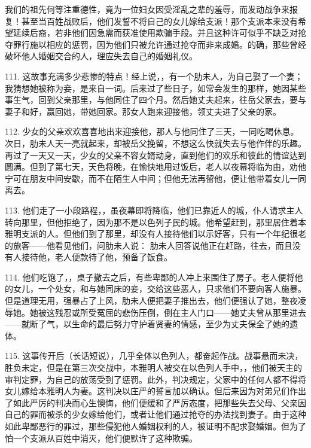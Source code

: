 \par

我们的祖先何等注重德性，竟为一位妇女因受淫乱之辈的羞辱，而发动战争来报复！甚至当百姓战败后，他们发誓不将自己的女儿嫁给支派！那个支派本来没有希望延续后裔，若非他们因急需而获准使用欺骗手段。并且这种许可似乎不缺乏对抢夺罪行施以相应的惩罚，因为他们只被允许通过抢夺而非来成婚。的确，那些曾经破坏他人婚姻交合的人，理应失去自己的婚姻礼仪。\par

111. 这故事充满多少悲惨的特点！经上说，，有一个肋未人，为自己娶了一个妻；我猜想她被称为妾，是来自一词。后来过了些日子，如常会发生的那样，她因某些事生气，回到父亲那里，与他同住了四个月。然后她丈夫起来，往岳父家去，要与妻子和好，赢回她，带她回家。那女人跑来迎接他，领丈夫进了父亲的家。\par

112. 少女的父亲欢欢喜喜地出来迎接他，那人与他同住了三天，一同吃喝休息。次日，肋未人天一亮就起来，却被岳父挽留，不想这么快就失去与他作伴的乐趣。再过了一天又一天，少女的父亲不容女婿动身，直到他们的欢乐和彼此的情谊达到圆满。但到了第七天，天色将晚，在愉快地用过饭后，老人以夜幕将临为由，劝他宁可在朋友中间安歇，而不在陌生人中间；但他无法再留他，便让他带着女儿一同离去。\par

113. 他们走了一小段路程，，虽夜幕即将降临，他们已靠近人的城，仆人请求主人转向那里，但他拒绝了，因为那不是以色列子民的城。他希望赶到，那里居住着本雅明支派的人。但他们到了那里，却没有人接待他们以示好客，只有一个年纪很老的旅客——他看见他们，问肋未人说： 肋未人回答说他正在赶路，往去，而且没有人接待他，老人便款待了他，预备了饭食。\par

114. 他们吃饱了，，桌子撤去之后，有些卑鄙的人冲上来围住了房子。老人便将他的女儿，一个处女，和与她同床的妾，交给这些恶人，只求他们不要向客人施暴。但是道理无用，强暴占了上风，肋未人便把妻子推出去，他们便强认了她，整夜凌辱她。她被这残忍或所受冤屈的悲伤压倒，倒在主人门口——她丈夫曾从那里进去——就断了气，以生命的最后努力守护着贤妻的情感，至少为丈夫保全了她的遗体。\par

115. 这事传开后（长话短说），几乎全体以色列人，都奋起作战。战事悬而未决，胜负未定，但是在第三次交战中，本雅明人被交在以色列人手中，，他们被天主的审判定罪，为自己的放荡受到了惩罚。此外，判决规定，父家中的任何人都不得将女儿嫁给本雅明人为妻。这判决以庄严的誓言加以确认。但后来因为对弟兄们作出了如此严厉的判决而心生懊悔，他们便缓和了严厉态度，把那些失去父母、父亲因自己的罪而被杀的少女嫁给他们，或者让他们通过抢夺的办法找到妻子。由于这种如此卑鄙恶行的罪过，那些侵犯他人婚姻权利的人，被证明不配求娶婚姻。但为了怕一个支派从百姓中消灭，他们便默许了这种欺骗。\par

